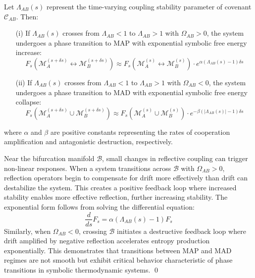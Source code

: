 \begin{proposition} 
\label{prop:bk5_transactional_covenant_dynamics}
Let $\Lambda_{AB}(s)$ represent the time-varying coupling stability parameter of covenant $\mathcal{C}_{AB}$. Then:
\begin{enumerate}
  \item[(i)] If $\Lambda_{AB}(s)$ crosses from $\Lambda_{AB} < 1$ to $\Lambda_{AB} > 1$ with $\Omega_{AB} > 0$, the system undergoes a phase transition to MAP with exponential symbolic free energy increase:
  \begin{equation}
  F_s(\mathscr{M}_A^{(s+\delta s)} \leftrightarrow \mathscr{M}_B^{(s+\delta s)}) \approx F_s(\mathscr{M}_A^{(s)} \leftrightarrow \mathscr{M}_B^{(s)}) \cdot e^{\alpha(\Lambda_{AB}(s)-1) \delta s}
  \end{equation}
  \item[(ii)] If $\Lambda_{AB}(s)$ crosses from $\Lambda_{AB} < 1$ to $\Lambda_{AB} > 1$ with $\Omega_{AB} < 0$, the system undergoes a phase transition to MAD with exponential symbolic free energy collapse:
  \begin{equation}
  F_s(\mathscr{M}_A^{(s+\delta s)} \cup \mathscr{M}_B^{(s+\delta s)}) \approx F_s(\mathscr{M}_A^{(s)} \cup \mathscr{M}_B^{(s)}) \cdot e^{-\beta(|\Lambda_{AB}(s)|-1) \delta s}
  \end{equation}
\end{enumerate}
\noindent where $\alpha$ and $\beta$ are positive constants representing the rates of cooperation amplification and antagonistic destruction, respectively.
\end{proposition}
\begin{demonstratio}
\label{demonstratio:bk_5_transitory_phasing}
Near the bifurcation manifold $\mathcal{B}$, small changes in reflective coupling can trigger non-linear responses. When a system transitions across $\mathcal{B}$ with $\Omega_{AB} > 0$, reflection operators begin to compensate for drift more effectively than drift can destabilize the system. This creates a positive feedback loop where increased stability enables more effective reflection, further increasing stability.
The exponential form follows from solving the differential equation:
\begin{equation}
\frac{d}{ds}F_s = \alpha(\Lambda_{AB}(s)-1)F_s
\end{equation}
Similarly, when $\Omega_{AB} < 0$, crossing $\mathcal{B}$ initiates a destructive feedback loop where drift amplified by negative reflection accelerates entropy production exponentially. This demonstrates that transitions between MAP and MAD regimes are not smooth but exhibit critical behavior characteristic of phase transitions in symbolic thermodynamic systems. \qed
\end{demonstratio}
